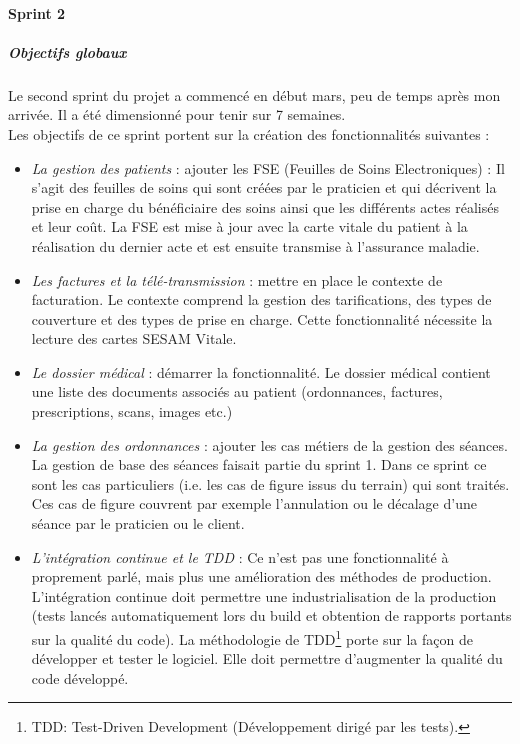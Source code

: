 \paragraph*{Sprint 2}
\subparagraph{Objectifs globaux}
Le second sprint du projet a commencé en début mars, peu de temps après mon arrivée. Il a été dimensionné pour tenir sur 7 semaines.\\
Les objectifs de ce sprint portent sur la création des fonctionnalités suivantes : 
\begin{itemize}
	\item \textit{La gestion des patients} : ajouter les FSE (Feuilles de Soins Electroniques) : Il s'agit des feuilles de soins qui sont créées par le praticien et qui décrivent la prise en charge du bénéficiaire des soins ainsi que les différents actes réalisés et leur coût. La \gls{FSE} est mise à jour avec la carte vitale du patient à la réalisation du dernier acte et est ensuite transmise à l'assurance maladie.
	
	\item \textit{Les factures et la télé-transmission} : mettre en place le contexte de facturation. Le contexte comprend la gestion des tarifications, des types de couverture et des types de prise en charge. Cette fonctionnalité nécessite la lecture des cartes SESAM Vitale.

	\item \textit{Le dossier médical} : démarrer la fonctionnalité. Le dossier médical contient une liste des documents associés au patient (ordonnances, factures, prescriptions, scans, images etc.)
	
	\item \textit{La gestion des ordonnances} : ajouter les cas métiers de la gestion des séances. La gestion de base des séances faisait partie du sprint 1. Dans ce sprint ce sont les cas particuliers (i.e. les cas de figure issus du terrain) qui sont traités. Ces cas de figure couvrent par exemple l'annulation ou le décalage d'une séance par le praticien ou le client.

	\item \textit{L'intégration continue et le TDD} : Ce n'est pas une fonctionnalité à proprement parlé, mais plus une amélioration des méthodes de production. L'intégration continue doit permettre une industrialisation de la production (tests lancés automatiquement lors du build et obtention de rapports portants sur la qualité du code). La méthodologie de TDD\footnote{TDD: Test-Driven Development (Développement dirigé par les tests).} porte sur la façon de développer et tester le logiciel. Elle doit permettre d'augmenter la qualité du code développé.
\end{itemize}


